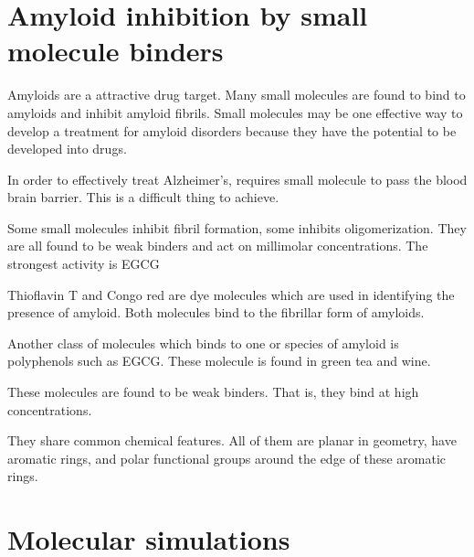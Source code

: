 \section{Amyloid inhibition by small molecule binders}
  \begin{outline}[enumerate]
    \1 Amyloids are a attractive drug target.  Many small molecules are found to bind to amyloids and inhibit amyloid fibrils.   Small molecules may be one effective way to develop a treatment for amyloid disorders because they have the potential to be developed into drugs.
    
    \1 In order to effectively treat Alzheimer's, requires small molecule to pass the blood brain barrier.  This is a difficult thing to achieve. 
    
    \1 Some small molecules inhibit fibril formation, some inhibits oligomerization. They are all found to be weak binders and act on millimolar concentrations. The strongest activity is EGCG

    \1 Thioflavin T and Congo red are dye molecules which are used in identifying the presence of amyloid.  Both molecules bind to the fibrillar form of amyloids.

    \1 Another class of molecules which binds to one or species of amyloid is polyphenols such as EGCG. These molecule is found in green tea and wine.
  
    \1 These molecules are found to be weak binders.  That is, they bind at high concentrations.  
  
    \1 They share common chemical features.  All of them are planar in geometry, have aromatic rings, and polar functional groups around the edge of these aromatic rings.
  \end{outline}

\section{Molecular simulations}



